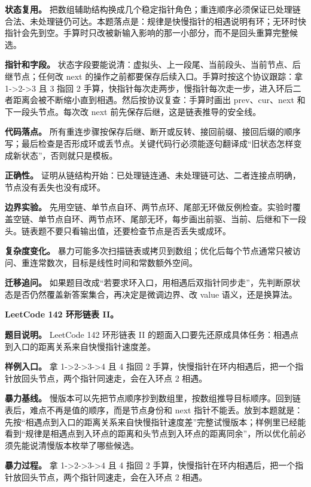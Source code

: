\textbf{状态复用。} 把数组辅助结构换成几个稳定指针角色；重连顺序必须保证已处理链合法、未处理链仍可达。本题落点是：规律是快慢指针的相遇说明有环；无环时快指针会先到空。手算时只改被新输入影响的那一小部分，而不是回头重算完整候选。

\textbf{指针和字段。} 状态字段要能说清：虚拟头、上一段尾、当前段头、当前节点、后继节点；任何改 next 的操作之前都要保存后续入口。手算时按这个协议跟踪：拿 1->2->3 且 3 指回 2 手算，快指针每次走两步，慢指针每次走一步，进入环后二者距离会被不断缩小直到相遇。然后按协议复查：手算时画出 prev、cur、next 和下一段头节点。每次改 next 前先保存后继，这是链表推导的安全线。

\textbf{代码落点。} 所有重连步骤按保存后继、断开或反转、接回前缀、接回后缀的顺序写；最后检查是否形成环或丢节点。关键代码行必须能逐句翻译成“旧状态怎样变成新状态”，否则就只是模板。

\textbf{正确性。} 证明从链结构开始：已处理链连通、未处理链可达、二者连接点明确，节点没有丢失也没有成环。

\textbf{边界实验。} 先用空链、单节点自环、两节点环、尾部无环做反例检查。实验时覆盖空链、单节点自环、两节点环、尾部无环，每步画出前驱、当前、后继和下一段头。链表题不要只看输出值，还要检查节点是否丢失或成环。

\textbf{复杂度变化。} 暴力可能多次扫描链表或拷贝到数组；优化后每个节点通常只被访问、重连常数次，目标是线性时间和常数额外空间。

\textbf{迁移追问。} 如果题目改成“若要求环入口，用相遇后双指针同步走”，先判断原状态是否仍然覆盖新答案集合，再决定是微调边界、改 value 语义，还是换算法。

\noindent\textbf{LeetCode 142 环形链表 II。}

\textbf{题目说明。} LeetCode 142 环形链表 II 的题面入口要先还原成具体任务：相遇点到入口的距离关系来自快慢指针速度差。

\textbf{样例入口。} 拿 1->2->3->4 且 4 指回 2 手算，快慢指针在环内相遇后，把一个指针放回头节点，两个指针同速走，会在入环点 2 相遇。

\textbf{暴力基线。} 慢版本可以先把节点顺序抄到数组里，按数组推导目标顺序。回到链表后，难点不再是值的顺序，而是节点身份和 next 指针不能丢。放到本题就是：先按“相遇点到入口的距离关系来自快慢指针速度差”完整试慢版本；样例里已经能看到“规律是相遇点到入环点的距离和头节点到入环点的距离同余”，所以优化前必须先能说清慢版本枚举了哪些候选。

\textbf{暴力过程。} 拿 1->2->3->4 且 4 指回 2 手算，快慢指针在环内相遇后，把一个指针放回头节点，两个指针同速走，会在入环点 2 相遇。


